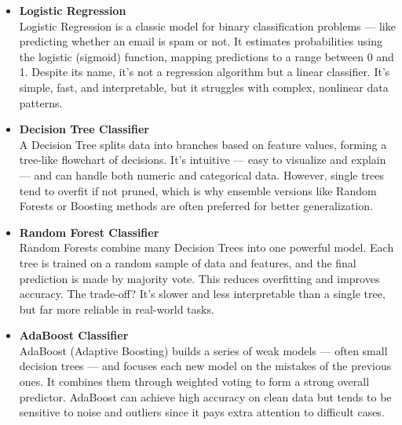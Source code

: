 \begin{itemize}
    \item \textbf{Logistic Regression}\\
    Logistic Regression is a classic model for binary classification problems — like predicting whether an email is spam or not.
    It estimates probabilities using the logistic (sigmoid) function, mapping predictions to a range between 0 and 1.
    Despite its name, it’s not a regression algorithm but a linear classifier.
    It’s simple, fast, and interpretable, but it struggles with complex, nonlinear data patterns.


    \item \textbf{Decision Tree Classifier}\\
    A Decision Tree splits data into branches based on feature values, forming a tree-like flowchart of decisions.
    It’s intuitive — easy to visualize and explain — and can handle both numeric and categorical data.
    However, single trees tend to overfit if not pruned, which is why ensemble versions like Random Forests or Boosting methods are often preferred for better generalization.


    \item \textbf{Random Forest Classifier}\\
    Random Forests combine many Decision Trees into one powerful model.
    Each tree is trained on a random sample of data and features, and the final prediction is made by majority vote.
    This reduces overfitting and improves accuracy.
    The trade-off?
    It’s slower and less interpretable than a single tree, but far more reliable in real-world tasks.


    \item \textbf{AdaBoost Classifier}\\
    AdaBoost (Adaptive Boosting) builds a series of weak models — often small decision trees — and focuses each new model on the mistakes of the previous ones.
    It combines them through weighted voting to form a strong overall predictor.
    AdaBoost can achieve high accuracy on clean data but tends to be sensitive to noise and outliers since it pays extra attention to difficult cases.


\end{itemize}
